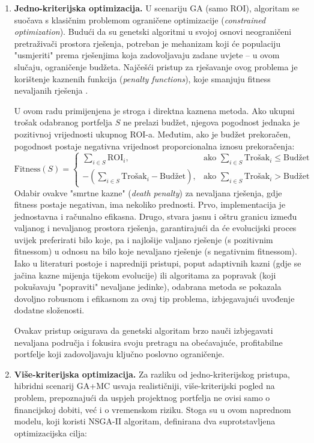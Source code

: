 \begin{enumerate}
    \item \textbf{Jedno-kriterijska optimizacija.}  
U scenariju GA (samo ROI), algoritam se suočava s klasičnim problemom ograničene optimizacije (\textit{constrained optimization}). Budući da su genetski algoritmi u svojoj osnovi neograničeni pretraživači prostora rješenja, potreban je mehanizam koji će populaciju "usmjeriti" prema rješenjima koja zadovoljavaju zadane uvjete – u ovom slučaju, ograničenje budžeta. Najčešći pristup za rješavanje ovog problema je korištenje kaznenih funkcija (\textit{penalty functions}), koje smanjuju fitness nevaljanih rješenja \cite{Goldberg1989}.

U ovom radu primijenjena je stroga i direktna kaznena metoda. Ako ukupni trošak odabranog portfelja $S$ ne prelazi budžet, njegova pogodnost jednaka je pozitivnoj vrijednosti ukupnog ROI-a. Međutim, ako je budžet prekoračen, pogodnost postaje negativna vrijednost proporcionalna iznosu prekoračenja:
$$
\text{Fitness}(S) = 
\begin{cases}
    \sum_{i \in S} \text{ROI}_i, & \text{ako } \sum_{i \in S} \text{Trošak}_i \leq \text{Budžet} \\
    -(\sum_{i \in S} \text{Trošak}_i - \text{Budžet}), & \text{ako } \sum_{i \in S} \text{Trošak}_i > \text{Budžet}
\end{cases}
$$
Odabir ovakve "smrtne kazne" (\textit{death penalty}) za nevaljana rješenja, gdje fitness postaje negativan, ima nekoliko prednosti. Prvo, implementacija je jednostavna i računalno efikasna. Drugo, stvara jasnu i oštru granicu između valjanog i nevaljanog prostora rješenja, garantirajući da će evolucijski proces uvijek preferirati bilo koje, pa i najlošije valjano rješenje (s pozitivnim fitnessom) u odnosu na bilo koje nevaljano rješenje (s negativnim fitnessom). Iako u literaturi postoje i napredniji pristupi, poput adaptivnih kazni (gdje se jačina kazne mijenja tijekom evolucije) ili algoritama za popravak (koji pokušavaju "popraviti" nevaljane jedinke), odabrana metoda se pokazala dovoljno robusnom i efikasnom za ovaj tip problema, izbjegavajući uvođenje dodatne složenosti.

Ovakav pristup osigurava da genetski algoritam brzo nauči izbjegavati nevaljana područja i fokusira svoju pretragu na obećavajuće, profitabilne portfelje koji zadovoljavaju ključno poslovno ograničenje.

    \item \textbf{Više-kriterijska optimizacija.}  
Za razliku od jedno-kriterijskog pristupa, hibridni scenarij GA+MC usvaja realističniji, više-kriterijski pogled na problem, prepoznajući da uspjeh projektnog portfelja ne ovisi samo o financijskoj dobiti, već i o vremenskom riziku. Stoga su u ovom naprednom modelu, koji koristi NSGA-II algoritam, definirana dva suprotstavljena optimizacijska cilja:


\end{enumerate}
